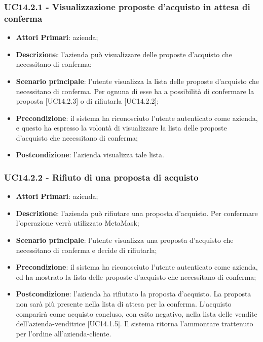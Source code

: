 \subsubsection{UC14.2.1 - Visualizzazione proposte d'acquisto in attesa di conferma}
\begin{itemize}
	\item \textbf{Attori Primari}: azienda;
	\item \textbf{Descrizione}: l'azienda può visualizzare delle proposte d'acquisto che necessitano di conferma;
	\item \textbf{Scenario principale}: l'utente visualizza la lista delle proposte d'acquisto che necessitano di conferma. Per ognuna di esse ha a possibilità di confermare la proposta [UC14.2.3] o di rifiutarla [UC14.2.2];
	\item \textbf{Precondizione}: il sistema ha riconosciuto l'utente autenticato come azienda, e questo ha espresso la volontà di visualizzare la lista delle proposte d'acquisto che necessitano di conferma;
	\item \textbf{Postcondizione}: l'azienda visualizza tale lista.
\end{itemize}
\subsubsection{UC14.2.2 - Rifiuto di una proposta di acquisto}
\begin{itemize}
	\item \textbf{Attori Primari}: azienda;
	\item \textbf{Descrizione}: l'azienda può rifiutare una proposta d'acquisto. Per confermare l'operazione verrà utilizzato MetaMask\glo;
	\item \textbf{Scenario principale}: l'utente visualizza una proposta d'acquisto che necessitano di conferma e decide di rifiutarla;
	\item \textbf{Precondizione}: il sistema ha riconosciuto l'utente autenticato come azienda, ed ha mostrato la lista delle proposte d'acquisto che necessitano di conferma;
	\item \textbf{Postcondizione}: l'azienda ha rifiutato la proposta d'acquisto. La proposta non sarà più presente nella lista di attesa per la conferma. L'acquisto comparirà come acquisto concluso, con esito negativo, nella lista delle vendite dell'azienda-venditrice [UC14.1.5]. Il sistema ritorna l'ammontare trattenuto per l'ordine all'azienda-cliente.
\end{itemize}
